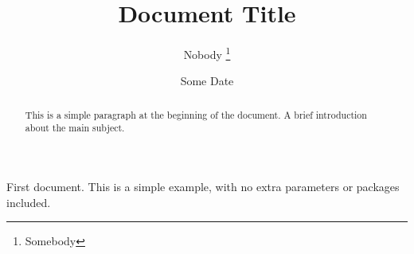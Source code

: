 \documentclass[12pt, letterpaper]{article}
\title{Document Title}
\author{Nobody \thanks{Somebody}}
\date{Some Date}
\begin{document}
\begin{titlepage}
\maketitle
\end{titlepage}

\tableofcontents

\begin{abstract}
This is a simple paragraph at the beginning of the
document. A brief introduction about the main subject.
\end{abstract}

First document. This is a simple example, with no
extra parameters or packages included.

\begin{comment}
This text won't show up in the compiled pdf
this is just a multi-line comment. Useful
to, for instance, comment out slow-rendering
while working on the draft.
\end{comment}
\end{document}
